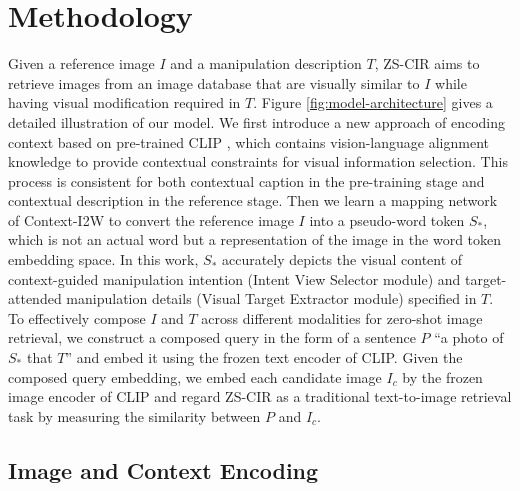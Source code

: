 \documentclass[letterpaper]{article} \usepackage{aaai24}  \usepackage{times}  \usepackage{helvet}  \usepackage{courier}  \usepackage[hyphens]{url}  \usepackage{graphicx} \urlstyle{rm} \def\UrlFont{\rm}  \usepackage{natbib}  \usepackage{caption} \frenchspacing  \setlength{\pdfpagewidth}{8.5in} \setlength{\pdfpageheight}{11in} \usepackage{algorithm}
\begin{document}
\section{Methodology}

Given a reference image $I$ and a manipulation description $T$, ZS-CIR aims to retrieve images from an image database that are visually similar to $I$ while having visual modification required in $T$. Figure \ref{fig:model-architecture} gives a detailed illustration of our model. We first introduce a new approach of encoding context based on pre-trained CLIP \cite{radford2021learning}, which contains vision-language alignment knowledge to provide contextual constraints for visual information selection. This process is consistent for both contextual caption in the pre-training stage and contextual description in the reference stage. Then we learn a mapping network of Context-I2W to convert the reference image $I$ into a pseudo-word token $S_{*}$, which is not an actual word but a representation of the image in the word token embedding space. In this work, $S_{*}$ accurately depicts the visual content of context-guided manipulation intention (Intent View Selector module) and target-attended manipulation details (Visual Target Extractor module) specified in $T$. To effectively compose  $I$ and $T$ across different modalities for zero-shot image retrieval, we construct a composed query in the form of a sentence $P$ ``a photo of $S_{*}$ that {$T$}” and embed it using the frozen text encoder of CLIP. Given the composed query embedding, we embed each candidate image $I_{c}$ by the frozen image encoder of CLIP and regard ZS-CIR as a traditional text-to-image retrieval task by measuring the similarity between $P$ and $I_{c}$.

\subsection{Image and Context Encoding}
\end{document}
